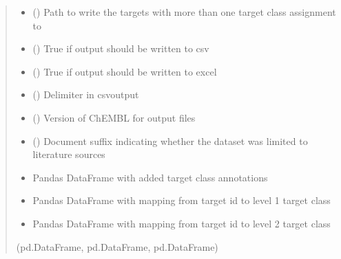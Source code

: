 \documentclass[letterpaper,10pt,english]{sphinxmanual}
\begin{document}
\begin{fulllineitems}
\begin{quote}
\begin{description}
\begin{itemize}
\item {} 
\sphinxAtStartPar
{} () \textendash{} Path to write the targets with more than one target class assignment to

\item {} 
\sphinxAtStartPar
{} () \textendash{} True if output should be written to csv

\item {} 
\sphinxAtStartPar
{} () \textendash{} True if output should be written to excel

\item {} 
\sphinxAtStartPar
{} () \textendash{} Delimiter in csv\sphinxhyphen{}output

\item {} 
\sphinxAtStartPar
{} () \textendash{} Version of ChEMBL for output files

\item {} 
\sphinxAtStartPar
{} () \textendash{} Document suffix indicating whether the dataset was limited to literature sources

\end{itemize}

\sphinxAtStartPar
\begin{itemize}
\item {} 
\sphinxAtStartPar
Pandas DataFrame with added target class annotations 

\item {} 
\sphinxAtStartPar
Pandas DataFrame with mapping from target id to level 1 target class 

\item {} 
\sphinxAtStartPar
Pandas DataFrame with mapping from target id to level 2 target class

\end{itemize}


\sphinxAtStartPar
(pd.DataFrame, pd.DataFrame, pd.DataFrame)

\end{description}\end{quote}

\end{fulllineitems}
\end{document}
